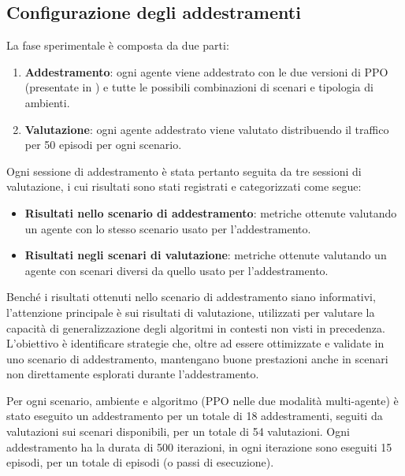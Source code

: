 \subsection{Configurazione degli addestramenti}

La fase sperimentale è composta da due parti:

\begin{enumerate}
    \item \textbf{Addestramento}: ogni agente viene addestrato con le due versioni di PPO (presentate in ) e tutte le possibili combinazioni di scenari e tipologia di ambienti.

    \item \textbf{Valutazione}: ogni agente addestrato viene valutato distribuendo il traffico per 50 episodi per ogni scenario.
\end{enumerate}

Ogni sessione di addestramento è stata pertanto seguita da tre sessioni di valutazione, i cui risultati sono stati registrati e categorizzati come segue:

\begin{itemize}
    \item \textbf{Risultati nello scenario di addestramento}: metriche ottenute valutando un agente con lo stesso scenario usato per l'addestramento.

    \item \textbf{Risultati negli scenari di valutazione}: metriche ottenute valutando un agente con scenari diversi da quello usato per l'addestramento.
\end{itemize}

Benché i risultati ottenuti nello scenario di addestramento siano informativi, l’attenzione principale è sui risultati di valutazione, utilizzati per valutare la capacità di generalizzazione degli algoritmi in contesti non visti in precedenza. L’obiettivo è identificare strategie che, oltre ad essere ottimizzate e validate in uno scenario di addestramento, mantengano buone prestazioni anche in scenari non direttamente esplorati durante l’addestramento.

Per ogni scenario, ambiente e algoritmo (PPO nelle due modalità multi-agente) è stato eseguito un addestramento per un totale di 18 addestramenti, seguiti da valutazioni sui scenari disponibili, per un totale di 54 valutazioni. Ogni addestramento ha la durata di 500 iterazioni, in ogni iterazione sono eseguiti 15 episodi, per un totale di  episodi (o  passi di esecuzione).

